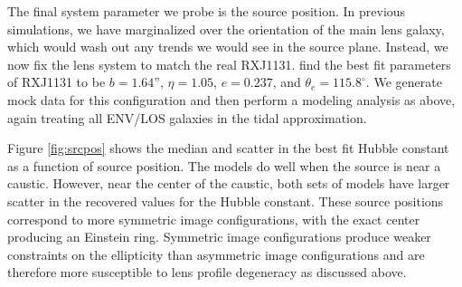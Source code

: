 \documentclass{emulateapj}
\begin{document}
The final system parameter we probe is the source position. In previous simulations, we have marginalized over the orientation of the main lens galaxy, which would wash out any trends we would see in the source plane. Instead, we now fix the lens system to match the real RXJ1131. \citet{Suyu13} find the best fit parameters of RXJ1131 to be $b = 1.64$'', $\eta = 1.05$, $e = 0.237$, and $\theta_e = 115.8^{\circ}$. We generate mock data for this configuration and then perform a modeling analysis as above, again treating all ENV/LOS galaxies in the tidal approximation.

Figure \ref{fig:srcpos} shows the median and scatter in the best fit Hubble constant as a function of source position. The models do well when the source is near a caustic. However, near the center of the caustic, both sets of models have larger scatter in the recovered values for the Hubble constant. These source positions correspond to more symmetric image configurations, with the exact center producing an Einstein ring. Symmetric image configurations produce weaker constraints on the ellipticity than asymmetric image configurations and are therefore more susceptible to lens profile degeneracy as discussed above.
\end{document}
